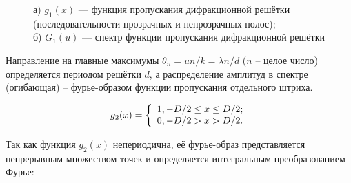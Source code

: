 \documentclass[a5paper,10pt, twoside]{article} %
\begin{document}
	\begin{figure}[h]
		\begin{minipage}[h]{0.49\linewidth}
		\end{minipage}
		\hfill
		\begin{minipage}[h]{0.49\linewidth}
		\end{minipage}
		\caption
		{
			а) $g_1 (x)$ — функция пропускания дифракционной решётки (последовательности 
							прозрачных и непрозрачных полос); \\
			б) $G_1 (u)$ — спектр функции пропускания дифракционной решётки
		}
		\label{ris:dr}
	\end{figure}
	
	Направление на главные максимумы $\theta_n = un / k = \lambda n / d$ ($n$ -- целое число) 
	определяется периодом решётки $d$, а распределение амплитуд в спектре (огибающая) -- 
	фурье-образом функции пропускания отдельного штриха.
	
	\begin{equation}
		g_2(x) = 
		\left\lbrace\begin{array}{c} 
			1, -D / 2 \le x \le D / 2; \\ 
			0, -D / 2 > x > D / 2.
		 \end{array} \right.
	\end{equation}
	
	Так	как функция	$g_2(x)$ непериодична, её фурье-образ представляется непрерывным множеством 
	точек и определяется интегральным преобразованием Фурье:
	
\end{document}
